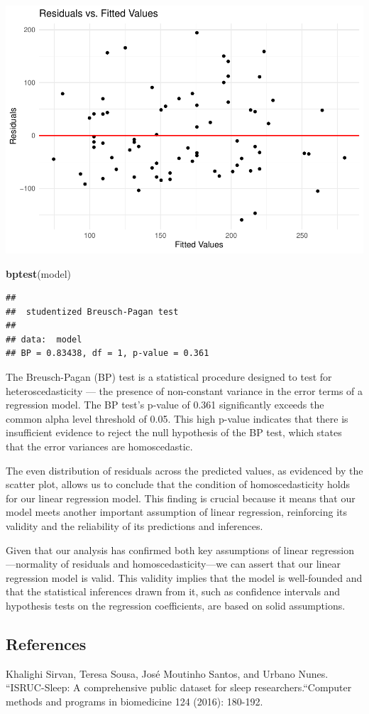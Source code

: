 \documentclass[
]{article}
\newenvironment{Shaded}{\begin{snugshade}}{\end{snugshade}}
\newcommand{\FunctionTok}[1]{\textcolor[rgb]{0.13,0.29,0.53}{\textbf{#1}}}
\newcommand{\NormalTok}[1]{#1}
\begin{document}
\includegraphics{602_project_files/figure-latex/unnamed-chunk-24-1.pdf}

\begin{Shaded}
\begin{Highlighting}[]
\FunctionTok{bptest}\NormalTok{(model)}
\end{Highlighting}
\end{Shaded}

\begin{verbatim}
## 
##  studentized Breusch-Pagan test
## 
## data:  model
## BP = 0.83438, df = 1, p-value = 0.361
\end{verbatim}

The Breusch-Pagan (BP) test is a statistical procedure designed to test
for heteroscedasticity --- the presence of non-constant variance in the
error terms of a regression model. The BP test's p-value of 0.361
significantly exceeds the common alpha level threshold of 0.05. This
high p-value indicates that there is insufficient evidence to reject the
null hypothesis of the BP test, which states that the error variances
are homoscedastic.

The even distribution of residuals across the predicted values, as
evidenced by the scatter plot, allows us to conclude that the condition
of homoscedasticity holds for our linear regression model. This finding
is crucial because it means that our model meets another important
assumption of linear regression, reinforcing its validity and the
reliability of its predictions and inferences.

Given that our analysis has confirmed both key assumptions of linear
regression---normality of residuals and homoscedasticity---we can assert
that our linear regression model is valid. This validity implies that
the model is well-founded and that the statistical inferences drawn from
it, such as confidence intervals and hypothesis tests on the regression
coefficients, are based on solid assumptions.

\hypertarget{references}{%
\subsection{References}\label{references}}

Khalighi Sirvan, Teresa Sousa, José Moutinho Santos, and Urbano Nunes.
``ISRUC-Sleep: A comprehensive public dataset for sleep
researchers.``Computer methods and programs in biomedicine 124 (2016):
180-192.
\end{document}
